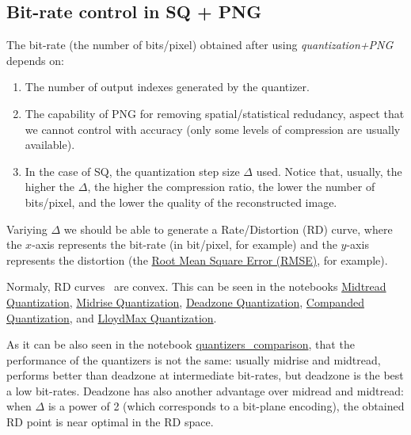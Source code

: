 
\subsection{Bit-rate control in SQ + PNG}

The bit-rate (the number of bits/pixel) obtained after using
\emph{quantization+PNG} depends on:
\begin{enumerate}
\item The number of output indexes generated by the quantizer.
\item The capability of PNG for removing spatial/statistical
  redudancy, aspect that we cannot control with accuracy (only some
  levels of compression are usually available).
\item In the case of SQ, the quantization step size $\Delta$
  used. Notice that, usually, the higher the $\Delta$, the higher the
  compression ratio, the lower the number of bits/pixel, and the lower
  the quality of the reconstructed image.
\end{enumerate}
Variying $\Delta$ we should be able to generate a Rate/Distortion (RD)
curve, where the $x$-axis represents the bit-rate (in bit/pixel, for
example) and the $y$-axis represents the distortion (the
\href{https://en.wikipedia.org/wiki/Root-mean-square_deviation}{Root
  Mean Square Error (RMSE)}, for example).

Normaly, RD curves~\cite{vruiz__information_theory} are convex. This
can be seen in the notebooks
\href{https://github.com/Sistemas-Multimedia/Sistemas-Multimedia.github.io/blob/master/contents/scalar_quantization/midtread.ipynb}{Midtread Quantization},
\href{https://github.com/Sistemas-Multimedia/Sistemas-Multimedia.github.io/blob/master/contents/scalar_quantization/midrise.ipynb}{Midrise Quantization},
\href{https://github.com/Sistemas-Multimedia/Sistemas-Multimedia.github.io/blob/master/contents/scalar_quantization/deadzone.ipynb}{Deadzone Quantization},
\href{https://github.com/Sistemas-Multimedia/Sistemas-Multimedia.github.io/blob/master/contents/scalar_quantization/companded.ipynb}{Companded Quantization},
and
\href{https://github.com/Sistemas-Multimedia/Sistemas-Multimedia.github.io/blob/master/contents/scalar_quantization/LloydMax.ipynb}{LloydMax Quantization}.

As it can be also seen in the notebook
\href{https://github.com/Sistemas-Multimedia/Sistemas-Multimedia.github.io/blob/master/contents/scalar_quantization/compare_quantizers.ipynb}{quantizers\_comparison},
that the performance of the quantizers is not the same: usually
midrise and midtread, performs better than deadzone at intermediate
bit-rates, but deadzone is the best a low bit-rates. Deadzone has also
another advantage over midread and midtread: when $\Delta$ is a power
of 2 (which corresponds to a bit-plane encoding), the obtained RD
point is near optimal in the RD space.

